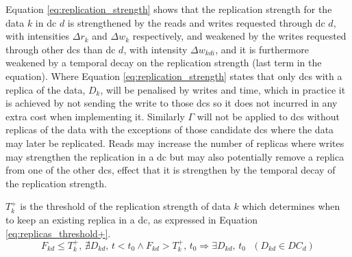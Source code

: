 \documentclass[english]{article}
\begin{document}

Equation \ref{eq:replication_strength} shows that the replication strength for the data $k$ in \gls{dc} $d$ is strengthened by the reads and writes requested through \gls{dc} $d$, with intensities $\Delta r_{k}$ and $\Delta w_{k}$ respectively, and weakened  by the writes requested through other \glspl{dc} than \gls{dc} $d$, with intensity $\Delta w_{kdi}$, and it is furthermore weakened by a temporal decay on the replication strength (last term in the equation). Where Equation \ref{eq:replication_strength} states that only \glspl{dc} with a replica of the data, $D_{k}$, will be penalised by writes and time, which in practice it is achieved by not sending the write to those \glspl{dc} so it does not incurred in any extra cost when implementing it. Similarly $\Gamma$ will not be applied to \glspl{dc} without replicas of the data with the exceptions of those candidate \glspl{dc} where the data may later be replicated. Reads may increase the number of replicas where writes may strengthen the replication in a \gls{dc} but may also potentially remove a replica from one of the other \glspl{dc}, effect that it is strengthen by the temporal decay of the replication strength.

$T^{+}_{k}$ is the threshold of the replication strength of data $k$ which determines when to keep an existing replica in a \gls{dc}, as expressed in Equation \ref{eq:replicas_threshold+}.
\begin{equation} \label{eq:replicas_threshold+}
	F_{kd} \le T^{+}_{k} \text{, } \nexists D_{kd} \text{, } t < t_{0}  \wedge F_{kd} > T^{+}_{k} \text{, } t_{0} \Longrightarrow \exists D_{kd} \text{, } t_{0} \text{ } (D_{kd} \in DC_{d})
\end{equation}
\end{document}
